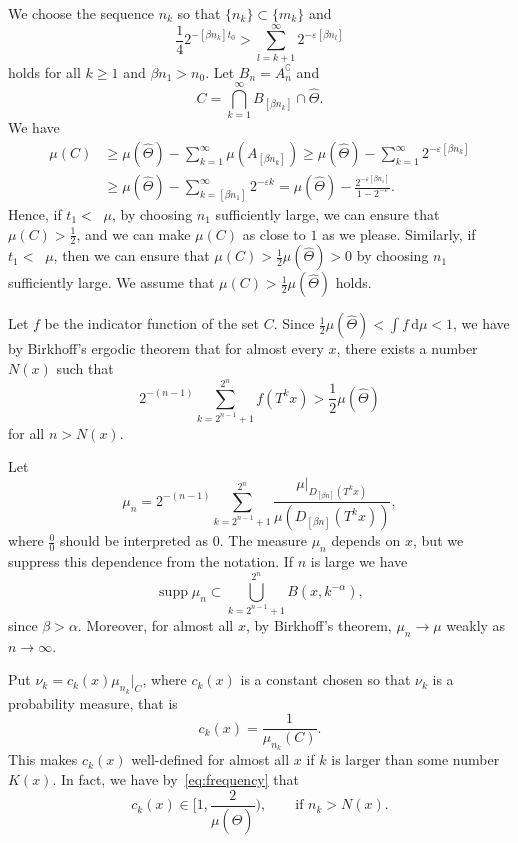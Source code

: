 \documentclass[11pt]{article}
\theoremstyle{definition}
\numberwithin{equation}{section}
\numberwithin{figure}{section}
\numberwithin{table}{section}
\DeclareMathOperator{\ldimh}{\underline{dim}_H}
\DeclareMathOperator{\udimh}{\overline{dim}_H}
\DeclareMathOperator{\supp}{supp}
\newcommand*{\dd}{\mathrm{d}}
\begin{document}
We choose the sequence $n_k$ so that $\{n_k\} \subset \{m_k\}$ and
\begin{equation}\label{eq:nk2}
\frac{1}{4} 2^{- [\beta n_k] t_0} > \sum_{l = k+1}^\infty 2^{-
\varepsilon [\beta n_l]}
\end{equation}
holds for all $k \geq 1$ and $\beta n_1 > n_0$. Let $B_n = A_n^\complement$ and
\[
C = \bigcap_{k=1}^\infty B_{[\beta n_k]} \cap \hat{\Theta}.
\]
We have
\begin{align*}
\mu (C) &\geq \mu (\hat{\Theta}) - \sum_{k=1}^\infty \mu (A_{[\beta n_k]}) \geq \mu (\hat{\Theta}) - \sum_{k=1}^\infty 2^{-
\varepsilon [\beta n_k]} \\ &\geq \mu (\hat{\Theta}) -
\sum_{k=[\beta n_1]}^\infty 2^{-\varepsilon k} = \mu (\hat{\Theta}) - \frac{2^{-\varepsilon [\beta n_1]}}{1 - 2^{-\varepsilon}}.
\end{align*}
Hence, if $t_1 < \ldimh \mu$, by choosing $n_1$ sufficiently large, we can ensure that $\mu (C) > \frac{1}{2}$, and we can make $\mu (C)$ as close to $1$ as we please. Similarly, if $t_1 < \udimh \mu$, then we can ensure that $\mu (C) > \frac{1}{2} \mu (\hat{\Theta}) > 0$ by choosing $n_1$ sufficiently large. We assume that $\mu (C) >
\frac{1}{2} \mu (\hat{\Theta})$ holds.

Let $f$ be the indicator function of the set $C$. Since $\frac{1}{2}
\mu (\hat{\Theta}) < \int f \, \dd \mu < 1$, we have by Birkhoff's ergodic theorem that for almost every $x$, there exists a number $N(x)$ such that
\begin{equation}\label{eq:frequency}
2^{-(n-1)} \sum_{k = 2^{n-1} + 1}^{2^n} f (T^k x) > \frac{1}{2} \mu (\hat{\Theta})
\end{equation}
for all $n > N (x)$.

Let
\[
\mu_n = 2^{-(n-1)} \sum_{k = 2^{n-1} + 1}^{2^n} \frac{\mu |_{D_{[\beta n]} (T^k x)}}{\mu (D_{[\beta n]} (T^k x))},
\]
where $\frac{0}{0}$ should be interpreted as $0$. The measure $\mu_n$ depends on $x$, but we suppress this dependence from the notation. If $n$ is large we have
\[
\supp \mu_n \subset \bigcup_{k = 2^{n-1}+1}^{2^n} B(x,k^{-\alpha}),
\]
since $\beta > \alpha$. Moreover, for almost all $x$, by Birkhoff's theorem, $\mu_n \to \mu$ weakly as $n \to \infty$.

Put $\nu_k = c_k(x) \mu_{n_k}|_C$, where $c_k (x)$ is a constant chosen so that $\nu_k$ is a probability measure, that is
\[
c_k (x) = \frac{1}{\mu_{n_k} (C)}.
\]
This makes $c_k (x)$ well-defined for almost all $x$ if $k$ is larger than some number $K(x)$. In fact, we have by~\eqref{eq:frequency} that
\[
c_k (x) \in \biggl[1,\frac{2}{\mu(\hat{\Theta})} \biggr), \qquad
\text{if } n_k > N(x).
\]
\end{document}
